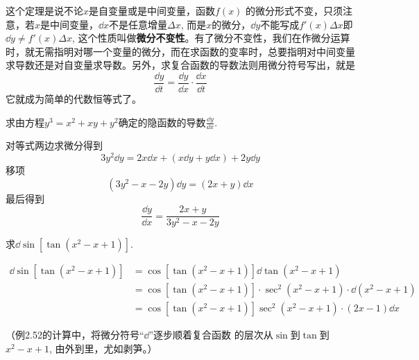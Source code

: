 这个定理是说不论$x$是自变量或是中间变量，函数$f(x)$
的微分形式不变，只须注意，若$x$是中间变量，$\dd x$不是任意增量$\Delta x$, 而是$x$的微分，$\dd y$不能写成$f'(x)\Delta x$即$\dd y\ne f'(x)\Delta x$, 这个性质叫做\textbf{微分不变性}。有了微分不变性，我们在作微分运算时，就无需指明对哪一个变量的微分，而在求函数的变率时，总要指明对中间变量求导数还是对自变量求导数。另外，求复合函数的导数法则用微分符号写出，就是
\[\frac{\dd y}{\dd t}=\frac{\dd y}{\dd x}\cdot \frac{\dd x}{\dd t}\]
它就成为简单的代数恒等式了。

\begin{example}
    求由方程$y^3=x^2+xy+y^2$确定的隐函数的导数$\frac{\dd y}{\dd x}$.
\end{example}

\begin{solution}
    对等式两边求微分得到
\[3y^2\dd y=2x\dd x+ (x\dd y+y\dd x) +2y\dd y\]
移项
\[(3y^2-x-2y)\dd y=(2x+y)\dd x\]
最后得到
\[\frac{\dd y}{\dd x}=\frac{2x+y}{3y^2-x-2y}\]
\end{solution}

\begin{example}
    求$\dd\sin [\tan(x^2-x+1)]$.
\end{example}


\begin{solution}
\[\begin{split}
    \dd\sin \left[\tan(x^2-x+1)\right]&=\cos\left[\tan(x^2-x+1)\right]\dd \tan(x^2-x+1)\\
    &=\cos\left[\tan(x^2-x+1)\right]\cdot \sec^2 (x^2-x+1)\cdot \dd (x^2-x+1)\\
    &=\cos\left[\tan(x^2-x+1)\right]\sec^2(x^2-x+1)\cdot (2x-1)\dd x 
\end{split}\]
\end{solution}
（例2.52的计算中，将微分符号“$\dd$”逐步顺着复合函数
的层次从$\sin$到$\tan$到$x^2-x+1$, 由外到里，尤如剥笋。）

